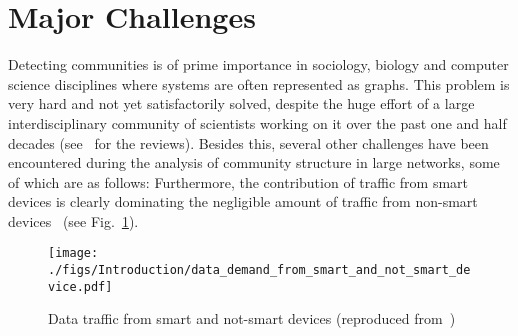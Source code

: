 \section{Major Challenges}
Detecting communities is of prime importance in sociology, biology and computer science disciplines where systems are often represented as
graphs. This problem is very hard and not yet satisfactorily solved, despite the huge effort of a large interdisciplinary community of
scientists working on it over the past one and half decades (see~\cite{Fortunato201075} for the reviews). Besides this,
several other challenges have been encountered during the analysis of community structure in large networks, some of which are as follows:
Furthermore, the contribution of traffic from smart devices is clearly dominating the negligible amount of traffic from non-smart devices~\cite{mobile_stat_cisco_2013} (see Fig.~\ref{mobile_smart}).
\begin{figure}[h!t]
\begin{center}
\texttt{[image: ./figs/Introduction/data\_demand\_from\_smart\_and\_not\_smart\_device.pdf]}
\caption{Data traffic from smart and not-smart devices (reproduced from~\cite{mobile_stat_cisco_2013})}
\label{mobile_smart}
\end{center}
\end{figure}
\fi
